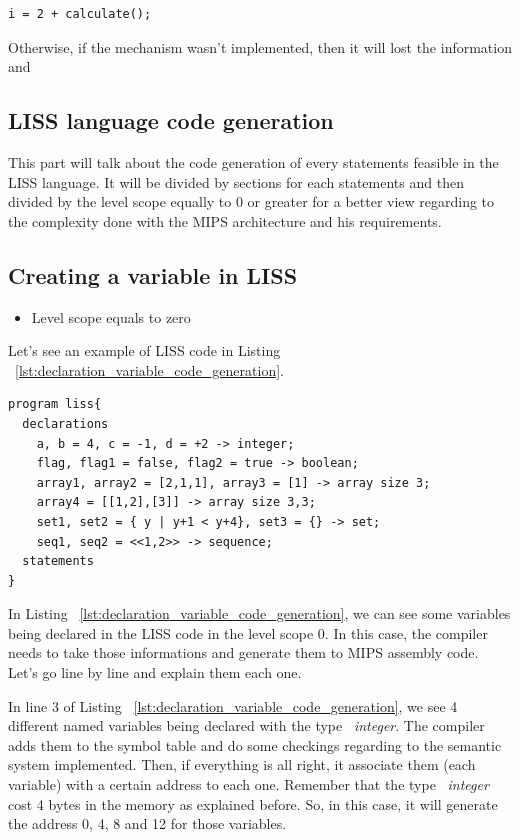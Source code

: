 \documentclass[
  oneside,
  11pt, a4paper,
  footinclude=true,
  headinclude=true,
  cleardoublepage=empty
]{scrbook}
\begin{document}
\begin{lstlisting}[caption={Example of a function call in an expression statement},label={lst:function_call_expression_liss}]
  i = 2 + calculate();
\end{lstlisting}

Otherwise, if the mechanism wasn't implemented, then it will lost the information and 



\subsection{LISS language code generation}

This part will talk about the code generation of every statements feasible in the LISS language.
It will be divided by sections for each statements and then divided by the level scope equally to 0 or greater for a better view regarding to the complexity done with the MIPS architecture and his requirements.

\subsection{Creating a variable in LISS}

\begin{itemize}
\item Level scope equals to zero
\end{itemize}

Let's see an example of LISS code in Listing ~\ref{lst:declaration_variable_code_generation}.

\begin{lstlisting}[caption={Example of creating variables in LISS},label={lst:declaration_variable_code_generation}]
program liss{
  declarations
    a, b = 4, c = -1, d = +2 -> integer;
    flag, flag1 = false, flag2 = true -> boolean;
    array1, array2 = [2,1,1], array3 = [1] -> array size 3;
    array4 = [[1,2],[3]] -> array size 3,3;
    set1, set2 = { y | y+1 < y+4}, set3 = {} -> set;
    seq1, seq2 = <<1,2>> -> sequence;
  statements
}
\end{lstlisting}

In Listing ~\ref{lst:declaration_variable_code_generation}, we can see some variables being declared in the LISS code in the level scope 0.
In this case, the compiler needs to take those informations and generate them to MIPS assembly code.
Let's go line by line and explain them each one.

In line 3 of Listing ~\ref{lst:declaration_variable_code_generation}, we see 4 different named variables being declared with the type ~\textit{integer}.
The compiler adds them to the symbol table and do some checkings regarding to the semantic system implemented. Then, if everything is all right, it associate them (each variable) with a certain address to each one. Remember that the type ~\textit{integer} cost 4 bytes in the memory as explained before. So, in this case, it will generate the address 0, 4, 8 and 12 for those variables.
\end{document}
